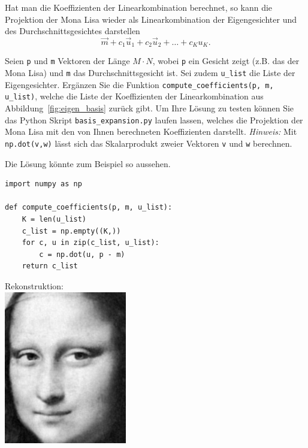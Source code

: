 Hat man die Koeffizienten der Linearkombination berechnet, so kann die Projektion der Mona Lisa wieder als Linearkombination der Eigengesichter und des Durchschnittsgesichtes darstellen
\begin{equation*}
	\vec m+c_1\vec u_1+c_2\vec u_2+\ldots+c_Ku_K.
\end{equation*}
\begin{aufgabe} \label{aufg:compute_coefficients}
	Seien \texttt{p} und \texttt{m} Vektoren der Länge $M\cdot N$, wobei \texttt{p} ein Gesicht zeigt (z.B. das der Mona Lisa) und \texttt{m} das Durchschnittsgesicht ist.
	Sei zudem \texttt{u\_list} die Liste der Eigengesichter.
	Ergänzen Sie die Funktion \texttt{compute\_coefficients(p, m, u\_list)}, welche die Liste der Koeffizienten der Linearkombination aus Abbildung~\ref{fig:eigen_basis} zurück gibt.
	Um Ihre Lösung zu testen können Sie das Python Skript \texttt{basis\_expansion.py} laufen lassen, welches die Projektion der Mona Lisa mit den von Ihnen berechneten Koeffizienten darstellt.
	\textit{Hinweis:} Mit \texttt{np.dot(v,w)} lässt sich das Skalarprodukt zweier Vektoren \texttt{v} und \texttt{w} berechnen.
\end{aufgabe}
\begin{losung*}
	Die Lösung könnte zum Beispiel so aussehen.\\[0.5cm]
	\begin{minipage}{0.65\textwidth}
\begin{lstlisting}[style=python]
import numpy as np

def compute_coefficients(p, m, u_list):
	K = len(u_list)
	c_list = np.empty((K,))
	for c, u in zip(c_list, u_list):
		c = np.dot(u, p - m)
	return c_list
\end{lstlisting}
	\end{minipage}\hfill
	\begin{minipage}{0.35\textwidth}\vspace{-1cm}
		\centering Rekonstruktion:\\[0.5cm]
		\includegraphics[width=0.4\textwidth]{images/eigenfaces/mona_lisa_eigen_approx}
	\end{minipage}
\end{losung*}

